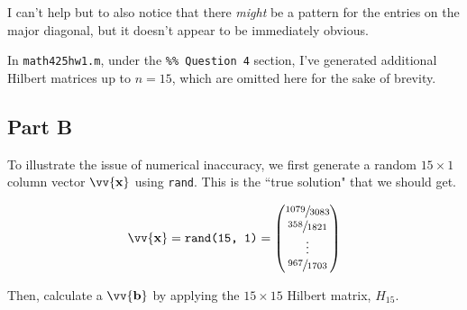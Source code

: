 \documentclass[12pt]{article}
\newcommand{\vect}[1]{\vv{\mathbf{#1}}}
\newcommand{\code}[1]{\texttt{#1}}
\begin{document}
I can't help but to also notice that there \textit{might} be a pattern for the entries on the major diagonal, but it doesn't appear to be immediately obvious.

In \code{math425hw1.m}, under the \code{\%\% Question 4} section, I've generated additional Hilbert matrices up to \( n = 15 \), which are omitted here for the sake of brevity.

\subsection*{Part B}

To illustrate the issue of numerical inaccuracy, we first generate a random $15\times1$ column vector $\vect{x}$ using \code{rand}. This is the ``true solution" that we should get.

$$
\vect{x} = \code{rand(15, 1)} = \begin{pmatrix*}
    \sfrac{1079}{3083} \\  
    \sfrac{358}{1821} \\  
    \vdots \\
    \sfrac{967}{1703}
\end{pmatrix*}
$$

Then, calculate a $\vect{b}$ by applying the $15\times15$ Hilbert matrix, $H_{15}$.
\end{document}
